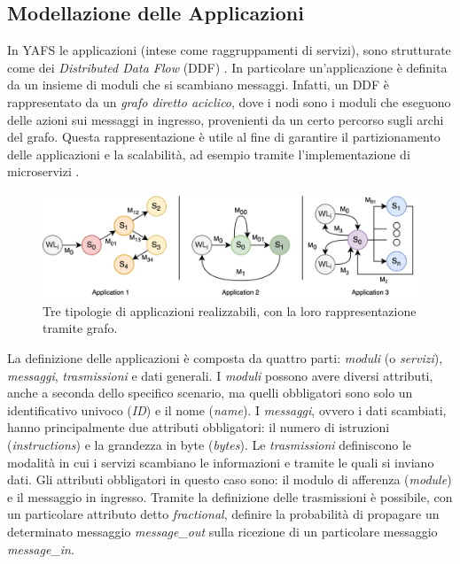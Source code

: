 \subsection{Modellazione delle Applicazioni}
In YAFS le applicazioni (intese come raggruppamenti di servizi), sono strutturate come dei \textit{Distributed Data Flow} (DDF) \cite{DDF_IOT_App}. In particolare un'applicazione è definita da un insieme di moduli che si scambiano messaggi. Infatti, un DDF è rappresentato da un \textit{grafo diretto aciclico}, dove i nodi sono i moduli che eseguono delle azioni sui messaggi in ingresso, provenienti da un certo percorso sugli archi del grafo. Questa rappresentazione è utile al fine di garantire il partizionamento delle applicazioni e la scalabilità, ad esempio tramite l'implementazione di microservizi \cite{microservices}. 

\begin{figure}[!ht]
  \includegraphics[width=14cm]{images/applications_ddf}
  \centering
  \caption{Tre tipologie di applicazioni realizzabili, con la loro rappresentazione tramite grafo. \cite{YAFSSimulator}}
  \label{fig:applications_ddf}
\end{figure}

La definizione delle applicazioni è composta da quattro parti: \textit{moduli} (o \textit{servizi}), \textit{messaggi}, \textit{trasmissioni} e dati generali. I \textit{moduli} possono avere diversi attributi, anche a seconda dello specifico scenario, ma quelli obbligatori sono solo un identificativo univoco (\textit{ID}) e il nome (\textit{name}). I \textit{messaggi}, ovvero i dati scambiati, hanno principalmente due attributi obbligatori: il numero di istruzioni (\textit{instructions}) e la grandezza in byte (\textit{bytes}). Le \textit{trasmissioni} definiscono le modalità in cui i servizi scambiano le informazioni e tramite le quali si inviano dati. Gli attributi obbligatori in questo caso sono: il modulo di afferenza (\textit{module}) e il messaggio in ingresso. Tramite la definizione delle trasmissioni è possibile, con un particolare attributo detto \textit{fractional}, definire la probabilità di propagare un determinato messaggio \textit{message\_out} sulla ricezione di un particolare messaggio \textit{message\_in}. 

